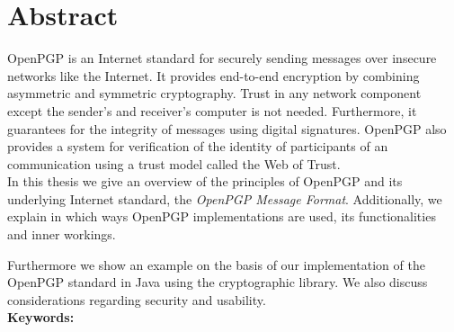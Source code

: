

\chapter*{Abstract}
\label{cha:abstract}


{OpenPGP} is an Internet standard for securely sending messages over insecure networks like the Internet. It provides end-to-end encryption by combining asymmetric and symmetric cryptography. Trust in any network component except the sender's and receiver's computer is not needed. Furthermore, it guarantees for the integrity of messages using digital signatures. OpenPGP also provides a system for verification of the identity of participants of an communication using a trust model called the Web of Trust. \\


In this thesis we give an overview of the principles of {OpenPGP} and its underlying Internet standard, the \textit{OpenPGP Message Format}. 
Additionally, we explain in which ways OpenPGP implementations are used, its functionalities and inner workings.

Furthermore we show an example on the basis of our implementation of the OpenPGP standard in Java using the  cryptographic library.
We also discuss considerations regarding security and usability.
\\



\textbf{Keywords:} \mykeywords

